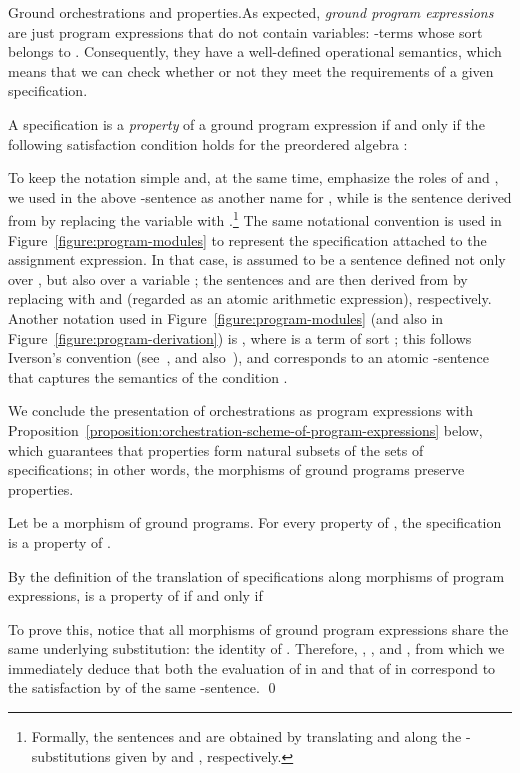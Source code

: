 \documentclass{LMCS}
\begin{document}
\begin{minisection}{Ground orchestrations and properties.}As expected, \emph{ground program expressions} are just program expressions that do not contain variables: \nb-terms  whose sort  belongs to .
  Consequently, they have a well-defined operational semantics, which means that we can check whether or not they meet the requirements of a given specification.

  A specification  is a \emph{property} of a ground program expression  if and only if the following satisfaction condition holds for the preordered algebra :
  
  To keep the notation simple and, at the same time, emphasize the roles of  and , we used  in the above \nb-sentence as another name for , while  is the sentence derived from  by replacing the variable  with .\footnote{Formally, the sentences  and  are obtained by translating  and  along the \nb-substitutions  given by  and , respectively.}
  The same notational convention is used in Figure~\ref{figure:program-modules} to represent the specification attached to the assignment expression.  In that case,  is assumed to be a sentence defined not only over , but also over a variable ; the sentences  and  are then derived from  by replacing  with  and  (regarded as an atomic arithmetic expression), respectively.
  Another notation used in Figure~\ref{figure:program-modules} (and also in Figure~\ref{figure:program-derivation}) is , where  is a term of sort ; this follows Iverson's convention (see~\cite{Iverson:A-Programming-Language-1962}, and also~\cite{Graham-Knuth-Patashnik:Concrete-Mathematics-1994}), and corresponds to an atomic \nb-sentence that captures the semantics of the condition .
  
  We conclude the presentation of orchestrations as program expressions with Proposition~\ref{proposition:orchestration-scheme-of-program-expressions} below, which guarantees that properties form natural subsets of the sets of specifications; in other words, the morphisms of ground programs preserve properties.
  

  \begin{prop}
    \label{proposition:orchestration-scheme-of-program-expressions}
    Let  be a morphism of ground programs.
    For every property  of , the specification  is a property of .
  \end{prop}
  
  \proof
  By the definition of the translation of specifications along morphisms of program expressions,  is a property of  if and only if
  
  To prove this, notice that all morphisms of ground program expressions share the same underlying substitution: the identity of .
  Therefore, , , and , from which we immediately deduce that both the evaluation of  in  and that of  in  correspond to the satisfaction by  of the same \nb-sentence.
  \qed
\end{minisection}
\end{document}
